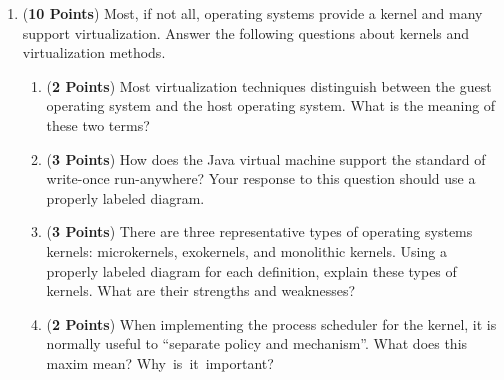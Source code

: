 \documentclass[12pt,epsf,psfig,graphics]{article}
\begin{document}
\begin{enumerate}
\begin{enumerate}
  \item ({\bf 3 Points}) The shell of an operating system allows for the composition of processes using the pipe and
    filter architecture.  In the following code segment, what is the pipe? What is the filter? Why is this a good mode
    of interaction with the operating system?

    \begin{quote}
      {\tt cat file1 file2 file3 | sort > /dev/lp \&}
    \end{quote}

  \item ({\bf 3 Points}) Figure~\ref{fig:clientserver} furnishes an example of client-server communication with the
    support of the operating system kernel. Please outline all of the steps that must take place to support the
    communication between ``Machine 1'' and ``Machine 2''. 

  \end{enumerate}

  \newpage

\item ({\bf 10 Points}) Most, if not all, operating systems provide a kernel and many support virtualization. Answer the
  following questions about kernels and virtualization methods.

  \begin{enumerate}

    \item ({\bf 2 Points}) Most virtualization techniques distinguish between the guest operating system and the host
      operating system.  What is the meaning of these two terms? 

    \item ({\bf 3 Points}) How does the Java virtual machine support the standard of write-once run-anywhere? Your
      response to this question should use a properly labeled diagram.

    \item ({\bf 3 Points}) There are three representative types of operating systems kernels: microkernels, exokernels,
      and monolithic kernels. Using a properly labeled diagram for each definition, explain these types of kernels. What
      are their strengths and weaknesses?

    \item ({\bf 2 Points}) When implementing the process scheduler for the kernel, it is normally useful to ``separate
      policy and mechanism''.  What does this maxim mean? \mbox{Why is it important}?


\end{enumerate}
\end{enumerate}
\end{document}

